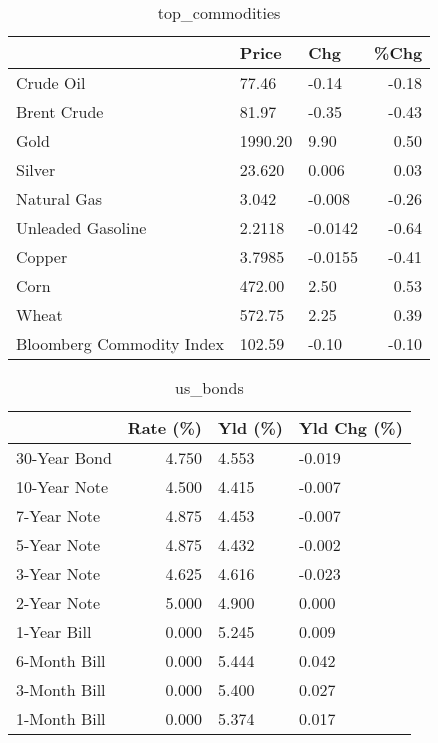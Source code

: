 \documentclass{article}%
\begin{document}
\begin{table}[htbp]%
\caption{top\_commodities}%
\centering%
\begin{adjustbox}{width=1\textwidth}%
\begin{tabular}{lllr}
\toprule
                          &   Price &     Chg &  \%Chg \\
\midrule
               Crude Oil  &   77.46 &   -0.14 & -0.18 \\
             Brent Crude  &   81.97 &   -0.35 & -0.43 \\
                    Gold  & 1990.20 &    9.90 &  0.50 \\
                  Silver  &  23.620 &   0.006 &  0.03 \\
             Natural Gas  &   3.042 &  -0.008 & -0.26 \\
       Unleaded Gasoline  &  2.2118 & -0.0142 & -0.64 \\
                  Copper  &  3.7985 & -0.0155 & -0.41 \\
                    Corn  &  472.00 &    2.50 &  0.53 \\
                   Wheat  &  572.75 &    2.25 &  0.39 \\
Bloomberg Commodity Index &  102.59 &   -0.10 & -0.10 \\
\bottomrule
\end{tabular}
%
\end{adjustbox}%
\end{table}

%


\begin{table}[htbp]%
\caption{us\_bonds}%
\centering%
\begin{adjustbox}{width=1\textwidth}%
\begin{tabular}{lrll}
\toprule
             &  Rate (\%) & Yld (\%) & Yld Chg (\%) \\
\midrule
30-Year Bond &     4.750 &   4.553 &      -0.019 \\
10-Year Note &     4.500 &   4.415 &      -0.007 \\
 7-Year Note &     4.875 &   4.453 &      -0.007 \\
 5-Year Note &     4.875 &   4.432 &      -0.002 \\
 3-Year Note &     4.625 &   4.616 &      -0.023 \\
 2-Year Note &     5.000 &   4.900 &       0.000 \\
 1-Year Bill &     0.000 &   5.245 &       0.009 \\
6-Month Bill &     0.000 &   5.444 &       0.042 \\
3-Month Bill &     0.000 &   5.400 &       0.027 \\
1-Month Bill &     0.000 &   5.374 &       0.017 \\
\bottomrule
\end{tabular}
%
\end{adjustbox}%
\end{table}
\end{document}
